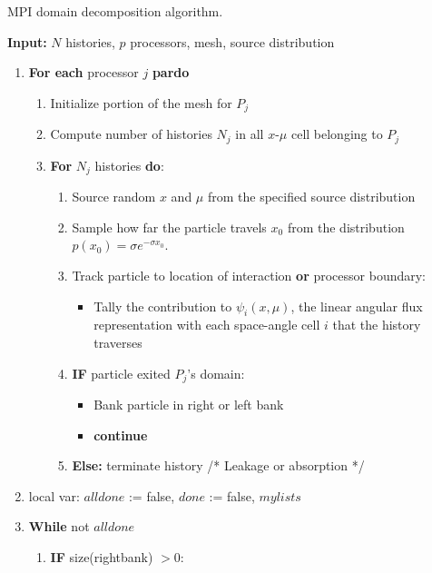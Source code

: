 \documentclass[12pt]{article}
\begin{document}
{{\begin{algorithm}
    \caption{MPI domain decomposition algorithm.\label{alg:dec}}
    \vspace{0.06in}
    \textbf{Input:} $N$ histories, $p$ processors, mesh, source distribution
    \vspace{-0.1in}
    \begin{enumerate}
    \item \textbf{For each} processor $j$ \textbf{pardo}
    \begin{enumerate} 
    \item Initialize portion of the mesh for $P_j$
    \item Compute number of histories $N_j$ in all $x$-$\mu$ cell belonging to $P_j$
    \item \textbf{For} {$N_j$ histories} \textbf{do}:
        \begin{enumerate}
       \item Source random $x$ and $\mu$ from the specified source distribution
       \item \label{itm:start} Sample how far the particle travels $x_0$ from the distribution $p(x_0) =
        \sigma e^{-\sigma x_0}$.
    \item Track particle to location of interaction \textbf{or} processor boundary:
        \begin{itemize}
            \item Tally the contribution to $\psi_i(x,\mu)$, the
                linear angular flux representation with each space-angle cell $i$
                that the history traverses
        \end{itemize}
    \item \textbf{IF} particle exited $P_j$'s domain:
        \begin{itemize}
            \item Bank particle in right or left bank
            \item \textbf{continue}
        \end{itemize}
    \item \textbf{Else:} \label{itm:end} terminate history /* Leakage or absorption */
\end{enumerate}
\end{enumerate}
    \item local var: $alldone$ := false, $done$ := false, $mylists$
    \item \textbf{While} not $alldone$
    \begin{enumerate}
       \item \textbf{IF} size(rightbank) $> 0$:

\end{enumerate}
\end{enumerate}
\end{algorithm}}}
\end{document}
